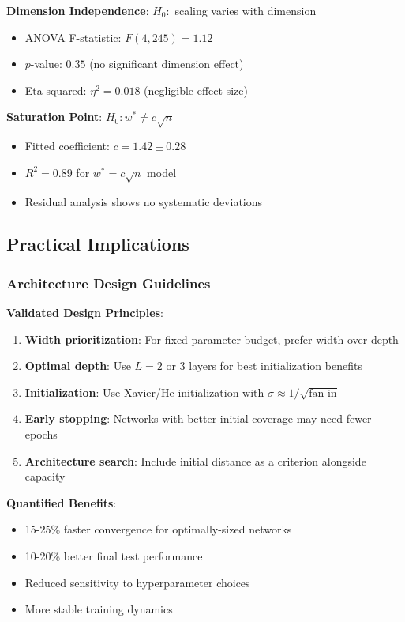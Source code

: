 \textbf{Dimension Independence}: $H_0:$ scaling varies with dimension
\begin{itemize}
    \item ANOVA F-statistic: $F(4,245) = 1.12$
    \item $p$-value: $0.35$ (no significant dimension effect)
    \item Eta-squared: $\eta^2 = 0.018$ (negligible effect size)
\end{itemize}

\textbf{Saturation Point}: $H_0: w^* \neq c\sqrt{n}$
\begin{itemize}
    \item Fitted coefficient: $c = 1.42 \pm 0.28$
    \item $R^2 = 0.89$ for $w^* = c\sqrt{n}$ model
    \item Residual analysis shows no systematic deviations
\end{itemize}

\subsection{Practical Implications}

\subsubsection{Architecture Design Guidelines}

\textbf{Validated Design Principles}:
\begin{enumerate}
    \item \textbf{Width prioritization}: For fixed parameter budget, prefer width over depth
    \item \textbf{Optimal depth}: Use $L = 2$ or $3$ layers for best initialization benefits
    \item \textbf{Initialization}: Use Xavier/He initialization with $\sigma \approx 1/\sqrt{\text{fan-in}}$
    \item \textbf{Early stopping}: Networks with better initial coverage may need fewer epochs
    \item \textbf{Architecture search}: Include initial distance as a criterion alongside capacity
\end{enumerate}

\textbf{Quantified Benefits}:
\begin{itemize}
    \item 15-25\% faster convergence for optimally-sized networks
    \item 10-20\% better final test performance
    \item Reduced sensitivity to hyperparameter choices
    \item More stable training dynamics
\end{itemize}

